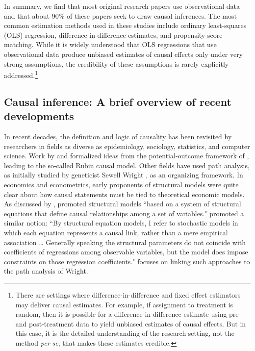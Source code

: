 \documentclass[12pt,reqno,titlepage]{amsart}
\theoremstyle{definition}
\begin{document}
\begin{doublespace}
In summary, we find that most original research papers use observational data and that about 90\% of these papers seek to draw causal inferences.
The most common estimation methods used in these studies include ordinary least-squares (OLS) regression, difference-in-difference estimates, and propensity-score matching.
While it is widely understood that OLS regressions that use observational data produce unbiased estimates of causal effects only under very strong assumptions, the credibility of these assumptions is rarely explicitly addressed.\footnote{
There are settings where difference-in-difference and fixed effect estimators may deliver causal estimates.
For example, if assignment to treatment is random, then it is possible for a difference-in-difference estimate using pre- and post-treatment data to yield unbiased estimates of causal effects.
But in this case, it is the detailed understanding of the research setting, not the method \emph{per se}, that makes these estimates credible.}

\subsection{Causal inference: A brief overview of recent developments}
In recent decades, the definition and logic of causality has been revisited by researchers in fields as diverse as epidemiology, sociology, statistics, and computer science. 
Work by \citet{Rubin:1974im,Rubin:1977dv} and \citet{Holland:1986p7458} formalized ideas from the potential-outcome framework of \citet{Neyman:1923aa}, leading to the so-called Rubin causal model. 
Other fields have used path analysis, as initially studied by geneticist Sewell Wright \citep{Wright:1921aa}, as an organizing framework.
In economics and econometrics, early proponents of structural models were quite clear about how causal statements must be tied to theoretical economic models.
As discussed by \citet{Heckman:2015ez}, \citet{Haavelmo:1943cl,Haavelmo:1944jq} promoted structural models ``based on a system of structural equations that define causal relationships among a set of variables."
\citet[p.\,979]{Goldberger:1972cq} promoted a similar notion: 
``By structural equation models, I refer to stochastic models in which each equation represents a causal link, rather than a mere empirical association \dots
Generally speaking the structural parameters do not coincide with coefficients of regressions among observable variables, but the model does impose constraints on those regression coefficients."
\citet{Goldberger:1972cq} focuses on linking such approaches to the path analysis of Wright.


\end{doublespace}
\end{document}
